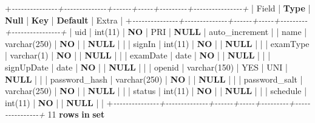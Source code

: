 \documentclass[
]{article}
\newenvironment{Shaded}{}{}
\newcommand{\CommentTok}[1]{\textcolor[rgb]{0.38,0.63,0.69}{\textit{#1}}}
\newcommand{\DataTypeTok}[1]{\textcolor[rgb]{0.56,0.13,0.00}{#1}}
\newcommand{\DecValTok}[1]{\textcolor[rgb]{0.25,0.63,0.44}{#1}}
\newcommand{\FunctionTok}[1]{\textcolor[rgb]{0.02,0.16,0.49}{#1}}
\newcommand{\KeywordTok}[1]{\textcolor[rgb]{0.00,0.44,0.13}{\textbf{#1}}}
\newcommand{\NormalTok}[1]{#1}
\newcommand{\OperatorTok}[1]{\textcolor[rgb]{0.40,0.40,0.40}{#1}}
\begin{document}
\begin{Shaded}
\begin{Highlighting}[]
\OperatorTok{+}\CommentTok{{-}{-}{-}{-}{-}{-}{-}{-}{-}{-}{-}{-}{-}{-}{-}+{-}{-}{-}{-}{-}{-}{-}{-}{-}{-}{-}{-}{-}{-}+{-}{-}{-}{-}{-}{-}+{-}{-}{-}{-}{-}+{-}{-}{-}{-}{-}{-}{-}{-}{-}+{-}{-}{-}{-}{-}{-}{-}{-}{-}{-}{-}{-}{-}{-}{-}{-}+}
\NormalTok{| Field         | }\KeywordTok{Type}\NormalTok{         | }\KeywordTok{Null}\NormalTok{ | }\KeywordTok{Key}\NormalTok{ | }\KeywordTok{Default}\NormalTok{ | Extra          |}
\OperatorTok{+}\CommentTok{{-}{-}{-}{-}{-}{-}{-}{-}{-}{-}{-}{-}{-}{-}{-}+{-}{-}{-}{-}{-}{-}{-}{-}{-}{-}{-}{-}{-}{-}+{-}{-}{-}{-}{-}{-}+{-}{-}{-}{-}{-}+{-}{-}{-}{-}{-}{-}{-}{-}{-}+{-}{-}{-}{-}{-}{-}{-}{-}{-}{-}{-}{-}{-}{-}{-}{-}+}
\NormalTok{| }\FunctionTok{uid}\NormalTok{           | }\DataTypeTok{int}\NormalTok{(}\DecValTok{11}\NormalTok{)      | }\KeywordTok{NO}\NormalTok{   | PRI | }\KeywordTok{NULL}\NormalTok{    | auto\_increment |}
\NormalTok{| name          | }\DataTypeTok{varchar}\NormalTok{(}\DecValTok{250}\NormalTok{) | }\KeywordTok{NO}\NormalTok{   |     | }\KeywordTok{NULL}\NormalTok{    |                |}
\NormalTok{| signIn        | }\DataTypeTok{int}\NormalTok{(}\DecValTok{11}\NormalTok{)      | }\KeywordTok{NO}\NormalTok{   |     | }\KeywordTok{NULL}\NormalTok{    |                |}
\NormalTok{| examType      | }\DataTypeTok{varchar}\NormalTok{(}\DecValTok{1}\NormalTok{)   | }\KeywordTok{NO}\NormalTok{   |     | }\KeywordTok{NULL}\NormalTok{    |                |}
\NormalTok{| examDate      | }\DataTypeTok{date}\NormalTok{         | }\KeywordTok{NO}\NormalTok{   |     | }\KeywordTok{NULL}\NormalTok{    |                |}
\NormalTok{| signUpDate    | }\DataTypeTok{date}\NormalTok{         | }\KeywordTok{NO}\NormalTok{   |     | }\KeywordTok{NULL}\NormalTok{    |                |}
\NormalTok{| openid        | }\DataTypeTok{varchar}\NormalTok{(}\DecValTok{150}\NormalTok{) | YES  | UNI | }\KeywordTok{NULL}\NormalTok{    |                |}
\NormalTok{| password\_hash | }\DataTypeTok{varchar}\NormalTok{(}\DecValTok{250}\NormalTok{) | }\KeywordTok{NO}\NormalTok{   |     | }\KeywordTok{NULL}\NormalTok{    |                |}
\NormalTok{| password\_salt | }\DataTypeTok{varchar}\NormalTok{(}\DecValTok{250}\NormalTok{) | }\KeywordTok{NO}\NormalTok{   |     | }\KeywordTok{NULL}\NormalTok{    |                |}
\NormalTok{| status        | }\DataTypeTok{int}\NormalTok{(}\DecValTok{11}\NormalTok{)      | }\KeywordTok{NO}\NormalTok{   |     | }\KeywordTok{NULL}\NormalTok{    |                |}
\NormalTok{| schedule      | }\DataTypeTok{int}\NormalTok{(}\DecValTok{11}\NormalTok{)      | }\KeywordTok{NO}\NormalTok{   |     | }\KeywordTok{NULL}\NormalTok{    |                |}
\OperatorTok{+}\CommentTok{{-}{-}{-}{-}{-}{-}{-}{-}{-}{-}{-}{-}{-}{-}{-}+{-}{-}{-}{-}{-}{-}{-}{-}{-}{-}{-}{-}{-}{-}+{-}{-}{-}{-}{-}{-}+{-}{-}{-}{-}{-}+{-}{-}{-}{-}{-}{-}{-}{-}{-}+{-}{-}{-}{-}{-}{-}{-}{-}{-}{-}{-}{-}{-}{-}{-}{-}+}
\DecValTok{11} \KeywordTok{rows} \KeywordTok{in} \KeywordTok{set}
\end{Highlighting}
\end{Shaded}
\end{document}
